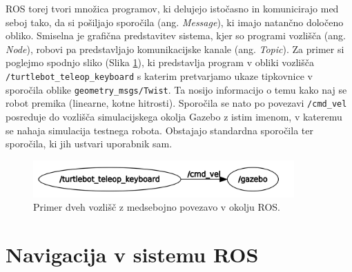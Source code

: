 ROS torej tvori množica programov, ki delujejo istočasno in komunicirajo med seboj tako, da si pošiljajo sporočila (ang. \textit{Message}), ki imajo natančno določeno obliko. Smiselna je grafična predstavitev sistema, kjer so programi vozlišča (ang. \textit{Node}), robovi pa predstavljajo komunikacijske kanale (ang. \textit{Topic}). Za primer si poglejmo spodnjo sliko (Slika \ref{fig:sl1}), ki predstavlja program v obliki vozlišča \texttt{/turtlebot\_teleop\_keyboard} s katerim pretvarjamo ukaze tipkovnice v sporočila oblike \texttt{geometry\_msgs/Twist}.  Ta nosijo informacijo o temu kako naj se robot premika (linearne, kotne hitrosti). Sporočila se nato po povezavi \texttt{/cmd\_vel} posreduje do vozlišča simulacijskega okolja Gazebo z istim imenom, v kateremu se nahaja simulacija testnega robota. Obstajajo standardna sporočila ter sporočila, ki jih ustvari uporabnik sam.

\begin{figure}[H]
	\centering
	\includegraphics[width=10cm]{pic/ros.png}
	\caption{Primer dveh vozlišč z medsebojno povezavo v okolju ROS.}
	\label{fig:sl1}
\end{figure}

\section{Navigacija v sistemu ROS}

